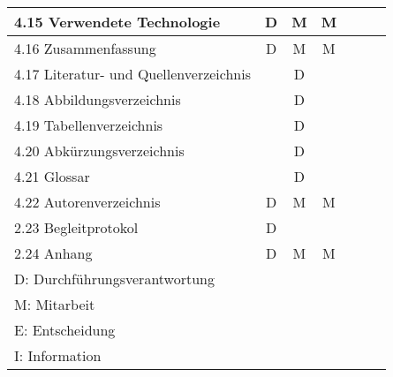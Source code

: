 \begin{longtable}{|l|c|c|c|c|c|c|}
  4.15 Verwendete Technologie            & D              & M           & M          &          &               &               \\ \hline
  4.16 Zusammenfassung                   & D              & M           & M          &          &               &               \\ \hline
  4.17 Literatur- und Quellenverzeichnis &                & D           &            &          &               &               \\ \hline
  4.18 Abbildungsverzeichnis             &                & D           &            &          &               &               \\ \hline
  4.19 Tabellenverzeichnis               &                & D           &            &          &               &               \\ \hline
  4.20 Abkürzungsverzeichnis             &                & D           &            &          &               &               \\ \hline
  4.21 Glossar                           &                & D           &            &          &               &               \\ \hline
  4.22 Autorenverzeichnis                & D              & M           & M          &          &               &               \\ \hline
  2.23 Begleitprotokol                   & D              &             &            &          &               &               \\ \hline
  2.24 Anhang                            & D              & M           & M          &          &               &               \\ \hline

  \multicolumn{7}{|l|}{D: Durchführungsverantwortung}                                                                           \\
  \multicolumn{7}{|l|}{M: Mitarbeit}                                                                                            \\
  \multicolumn{7}{|l|}{E: Entscheidung}                                                                                         \\
  \multicolumn{7}{|l|}{I: Information}                                                                                          \\ \hline


\end{longtable}